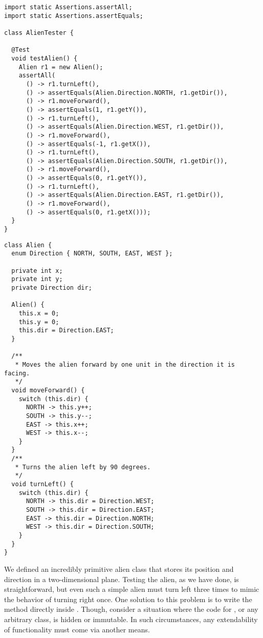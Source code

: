 \begin{lstlisting}[language=MyJava]
import static Assertions.assertAll;
import static Assertions.assertEquals;

class AlienTester {

  @Test
  void testAlien() {
    Alien r1 = new Alien();
    assertAll(
      () -> r1.turnLeft(),
      () -> assertEquals(Alien.Direction.NORTH, r1.getDir()),
      () -> r1.moveForward(),
      () -> assertEquals(1, r1.getY()),
      () -> r1.turnLeft(),
      () -> assertEquals(Alien.Direction.WEST, r1.getDir()),
      () -> r1.moveForward(),
      () -> assertEquals(-1, r1.getX()),
      () -> r1.turnLeft(),
      () -> assertEquals(Alien.Direction.SOUTH, r1.getDir()),
      () -> r1.moveForward(),
      () -> assertEquals(0, r1.getY()),
      () -> r1.turnLeft(),
      () -> assertEquals(Alien.Direction.EAST, r1.getDir()),
      () -> r1.moveForward(),
      () -> assertEquals(0, r1.getX()));
  }
}
\end{lstlisting}

\begin{lstlisting}[language=MyJava]
class Alien {
  enum Direction { NORTH, SOUTH, EAST, WEST };

  private int x;
  private int y;
  private Direction dir;

  Alien() {
    this.x = 0;
    this.y = 0;
    this.dir = Direction.EAST;
  }

  /**
   * Moves the alien forward by one unit in the direction it is facing.
   */
  void moveForward() {
    switch (this.dir) {
      NORTH -> this.y++;
      SOUTH -> this.y--;
      EAST -> this.x++;
      WEST -> this.x--;
    }
  }
  /**
   * Turns the alien left by 90 degrees.
   */
  void turnLeft() {
    switch (this.dir) {
      NORTH -> this.dir = Direction.WEST;
      SOUTH -> this.dir = Direction.EAST;
      EAST -> this.dir = Direction.NORTH;
      WEST -> this.dir = Direction.SOUTH;
    }
  }
}
\end{lstlisting}

We defined an incredibly primitive alien class that stores its position and direction in a two-dimensional plane. 
Testing the alien, as we have done, is straightforward, but even such a simple alien must turn left three times to mimic the behavior of turning right once. 
One solution to this problem is to write the  method directly inside . 
Though, consider a situation where the code for , or any arbitrary class, is hidden or immutable. 
In such circumstances, any extendability of functionality must come via another means. 

